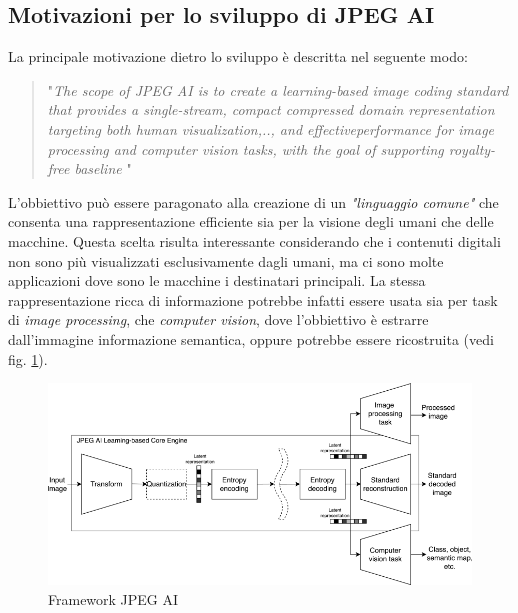 \subsection{Motivazioni per lo sviluppo di JPEG AI}
La principale motivazione dietro lo sviluppo è descritta nel seguente modo:
\begin{quote}
    "\textit{The scope of JPEG AI is to create a learning-based image coding standard that provides a single-stream, compact compressed domain representation targeting both human visualization,.., and effectiveperformance for image processing and computer vision tasks, with the goal of supporting royalty-free baseline} \cite{ascenso2023jpegAI}"
\end{quote}
L'obbiettivo può essere paragonato alla creazione di un \textit{"linguaggio comune"} che consenta una rappresentazione  efficiente sia per la visione degli umani che delle macchine. Questa scelta risulta interessante considerando che i contenuti digitali non sono più visualizzati esclusivamente dagli umani, ma ci sono molte applicazioni dove sono le macchine i destinatari principali.
La stessa rappresentazione ricca di informazione potrebbe infatti essere usata sia per task di \textit{image processing}, che \textit{computer vision}, dove l'obbiettivo è estrarre dall'immagine informazione semantica, oppure potrebbe essere ricostruita (vedi fig. \ref{fig:fig:jpeg_frw}).
\begin{figure}
    \centering
    \includegraphics[width=1\linewidth]{img/JPEG AI.png}
    \caption{Framework JPEG AI}
    \label{fig:fig:jpeg_frw}
\end{figure}\\
